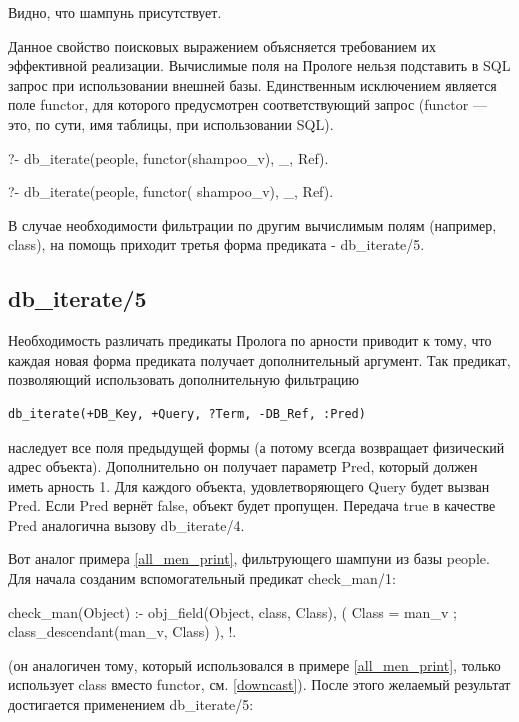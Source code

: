 \documentclass[a4paper]{book}
\begin{document}
Видно, что шампунь присутствует.

Данное свойство поисковых выражением объясняется требованием их
эффективной реализации. Вычислимые поля на Прологе нельзя
подставить в SQL запрос при использовании внешней
базы. Единственным исключением является поле functor, для
которого предусмотрен соответствующий запрос (functor --- это, по
сути, имя таблицы, при использовании SQL).

\begin{example}{}{}
?- db_iterate(people, functor(shampoo_v), _, Ref).

?- db_iterate(people, functor(\+ shampoo_v), _, Ref).
\end{example}

В случае необходимости фильтрации по другим вычислимым полям
(например, class), на помощь приходит третья форма предиката -
db\_iterate/5.

\subsection{db\_iterate/5}

Необходимость различать предикаты Пролога по арности приводит к
тому, что каждая новая форма предиката получает дополнительный
аргумент. Так предикат, позволяющий использовать дополнительную
фильтрацию

\begin{verbatim}
db_iterate(+DB_Key, +Query, ?Term, -DB_Ref, :Pred)
\end{verbatim}

наследует все поля предыдущей формы (а потому всегда возвращает
физический адрес объекта). Дополнительно он получает параметр
Pred, который должен иметь арность 1. Для каждого объекта,
удовлетворяющего Query будет вызван Pred. Если Pred вернёт false,
объект будет пропущен. Передача true в качестве Pred аналогична
вызову db\_iterate/4.

Вот аналог примера \ref{all_men_print}, фильтрующего шампуни из
базы people. Для начала созданим вспомогательный предикат
check_man/1:

\begin{example}{}{}
check_man(Object) :- obj_field(Object, class, Class), 
   ( Class = man_v 
   ; class_descendant(man_v, Class)
   ), !.
\end{example}

(он аналогичен тому, который использовался в примере
\ref{all_men_print}, только использует class вместо functor,
см. \ref{downcast}). После этого желаемый результат достигается
применением db_iterate/5:
\end{document}
